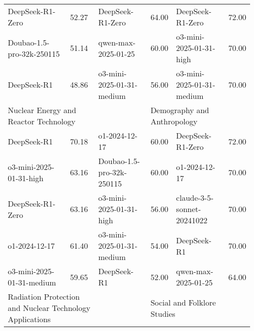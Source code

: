 {\begin{longtable}{p{4.2cm}>{\centering\arraybackslash} p{0.8cm}|p{4.2cm} >{\centering\arraybackslash} p{0.8cm}|p{4.2cm} >{\centering\arraybackslash} p{0.8cm}}
\cellcolor{blue!5} DeepSeek-R1-Zero & \cellcolor{blue!2}52.27 & \cellcolor{yellow!5} DeepSeek-R1-Zero & \cellcolor{yellow!2} 64.00 & \cellcolor{green!5} DeepSeek-R1-Zero & \cellcolor{green!2} 72.00\\
\cellcolor{blue!5} Doubao-1.5-pro-32k-250115 & \cellcolor{blue!2}51.14 & \cellcolor{yellow!5} qwen-max-2025-01-25 & \cellcolor{yellow!2} 60.00 & \cellcolor{green!5} o3-mini-2025-01-31-high & \cellcolor{green!2} 70.00\\
\cellcolor{blue!5} DeepSeek-R1 & \cellcolor{blue!2}48.86 & \cellcolor{yellow!5} o3-mini-2025-01-31-medium & \cellcolor{yellow!2} 56.00 & \cellcolor{green!5} o3-mini-2025-01-31-medium & \cellcolor{green!2} 70.00\\
\hline
\multicolumn{2}{p{5.15cm}|}{\cellcolor{blue!10} \centering Nuclear Energy and Reactor Technology} & \multicolumn{2}{p{5.15cm}|}{\cellcolor{yellow!10} \centering Microbiology and Biochemical Pharmacy} & \multicolumn{2}{p{5.15cm}}{\cellcolor{olive!10} \centering Demography and Anthropology}\\
\hline
\cellcolor{blue!5} DeepSeek-R1 & \cellcolor{blue!2}70.18 & \cellcolor{yellow!5} o1-2024-12-17 & \cellcolor{yellow!2} 60.00 & \cellcolor{olive!5} DeepSeek-R1-Zero & \cellcolor{olive!2} 72.00\\
\cellcolor{blue!5} o3-mini-2025-01-31-high & \cellcolor{blue!2}63.16 & \cellcolor{yellow!5} Doubao-1.5-pro-32k-250115 & \cellcolor{yellow!2} 60.00 & \cellcolor{olive!5} o1-2024-12-17 & \cellcolor{olive!2} 70.00\\
\cellcolor{blue!5} DeepSeek-R1-Zero & \cellcolor{blue!2}63.16 & \cellcolor{yellow!5} o3-mini-2025-01-31-high & \cellcolor{yellow!2} 56.00 & \cellcolor{olive!5} claude-3-5-sonnet-20241022 & \cellcolor{olive!2} 70.00\\
\cellcolor{blue!5} o1-2024-12-17 & \cellcolor{blue!2}61.40 & \cellcolor{yellow!5} o3-mini-2025-01-31-medium & \cellcolor{yellow!2} 54.00 & \cellcolor{olive!5} DeepSeek-R1 & \cellcolor{olive!2} 70.00\\
\cellcolor{blue!5} o3-mini-2025-01-31-medium & \cellcolor{blue!2}59.65 & \cellcolor{yellow!5} DeepSeek-R1 & \cellcolor{yellow!2} 52.00 & \cellcolor{olive!5} qwen-max-2025-01-25 & \cellcolor{olive!2} 64.00\\
\hline
\multicolumn{2}{p{5.15cm}|}{\cellcolor{blue!10} \centering Radiation Protection and Nuclear Technology Applications} & \multicolumn{2}{p{5.15cm}|}{\cellcolor{yellow!10} \centering Pharmaceutical Analysis} & \multicolumn{2}{p{5.15cm}}{\cellcolor{olive!10} \centering Social and Folklore Studies}\\

\end{longtable}}
